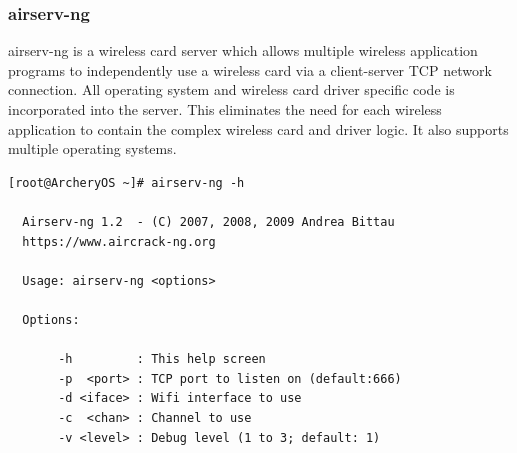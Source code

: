 \documentclass{article}
\begin{document}
\subsubsection{airserv-ng}
airserv-ng is a wireless card server which allows multiple wireless application programs to independently use a wireless card via  a  client-server TCP network connection. All operating system and wireless card driver specific code is incorporated into the server. This eliminates the  need  for each  wireless application to contain the complex wireless card and driver logic. It also supports multiple operating systems.
\begin{lstlisting}
[root@ArcheryOS ~]# airserv-ng -h

  Airserv-ng 1.2  - (C) 2007, 2008, 2009 Andrea Bittau
  https://www.aircrack-ng.org

  Usage: airserv-ng <options>

  Options:

       -h         : This help screen
       -p  <port> : TCP port to listen on (default:666)
       -d <iface> : Wifi interface to use
       -c  <chan> : Channel to use
       -v <level> : Debug level (1 to 3; default: 1)
\end{lstlisting}
\end{document}

